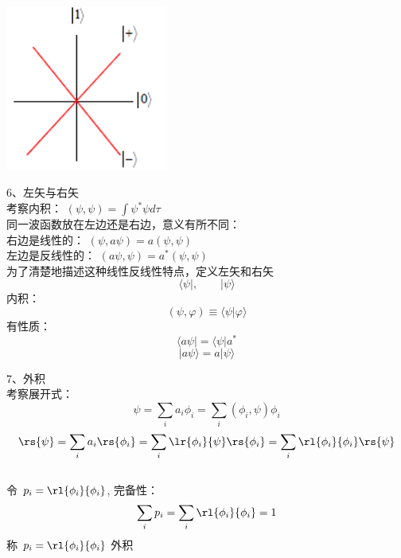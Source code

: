 \begin{frame} 
    \begin{center}
        \includegraphics[width=0.4\textwidth]{figs/9.png}
    \end{center} 
\end{frame}


\begin{frame}{}
    6、左矢与右矢\\
    考察内积： $(\psi,\psi)=\int\psi^*\psi d\tau$ \\
    同一波函数放在左边还是右边，意义有所不同： \\
    右边是线性的：  $(\psi,a\psi)=a (\psi,\psi)$ \\
    左边是反线性的：   $(a\psi,\psi)=a^* (\psi,\psi)$  \\
    为了清楚地描述这种线性反线性特点，定义左矢和右矢
    $$\langle \psi |, \qquad |\psi \rangle $$ 
    内积：\[(\psi,\varphi)\equiv \langle \psi | \varphi \rangle\]
    有性质： $$\langle a\psi | = \langle \psi |a^* $$
    $$ |a\psi \rangle = a|\psi \rangle$$ 
\end{frame}

\begin{frame}{}
    7、外积\\
    考察展开式： \[\psi=\sum_i a_i \phi_i= \sum_i (\phi_i,\psi) \phi_i\]
    \[\rs{\psi}=\sum_i a_i \rs{\phi_i}= \sum_i \lr{\phi_i}{\psi} \rs{\phi_i} =\sum_i \rl{\phi_i}{\phi_i} \rs{\psi}\]
    ~~\\
    令 $p_i= \rl{\phi_i}{\phi_i} $, 完备性：
    \[\sum_i p_i= \sum_i \rl{\phi_i}{\phi_i}=1 \]
    称  $p_i= \rl{\phi_i}{\phi_i} $ 外积
\end{frame}

